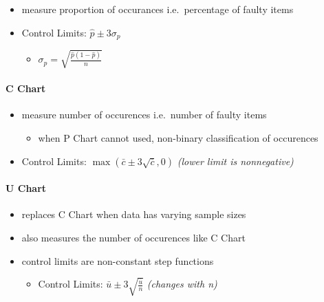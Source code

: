 \documentclass[11pt]{article}
\providecommand{\tightlist}{%
      \setlength{\itemsep}{0pt}\setlength{\parskip}{0pt}}
\begin{document}
\begin{itemize}
\tightlist
\item
  measure proportion of occurances i.e.~percentage of faulty items
\item
  Control Limits: \(\hat p\pm3\sigma_p\)

  \begin{itemize}
  \tightlist
  \item
    \(\sigma_p=\sqrt{\frac{\hat p(1-\hat p)}{n}}\)
  \end{itemize}
\end{itemize}

\hypertarget{c-chart}{%
\paragraph{C Chart}\label{c-chart}}

\begin{itemize}
\tightlist
\item
  measure number of occurences i.e.~number of faulty items

  \begin{itemize}
  \tightlist
  \item
    when P Chart cannot used, non-binary classification of occurences
  \end{itemize}
\item
  Control Limits: \(\max(\bar c\pm3\sqrt{\bar c}, 0)\) \emph{(lower
  limit is nonnegative)}
\end{itemize}

\hypertarget{u-chart}{%
\paragraph{U Chart}\label{u-chart}}

\begin{itemize}
\tightlist
\item
  replaces C Chart when data has varying sample sizes
\item
  also measures the number of occurences like C Chart
\item
  control limits are non-constant step functions

  \begin{itemize}
  \tightlist
  \item
    Control Limits: \(\bar u\pm3\sqrt{\frac{\bar u}{n}}\) \emph{(changes
    with n)}
  \end{itemize}
\end{itemize}
\end{document}
